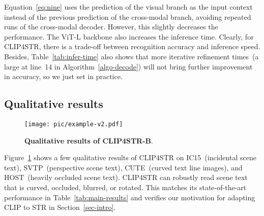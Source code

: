 \documentclass[lettersize,journal]{IEEEtran}
\begin{document}
Equation~\eqref{eq:nine} uses the prediction of the visual branch as the input context instead of the previous prediction of the cross-modal branch, avoiding repeated runs of the cross-modal decoder. However, this slightly decreases the performance.
The ViT-L backbone also increases the inference time.
Clearly, for CLIP4STR, there is a trade-off between recognition accuracy and inference speed. Besides, Table~\ref{tab:infer-time} also shows that more iterative refinement times~(a large  at line~14 in Algorithm~\ref{algo-decode}) will not bring further improvement in accuracy, so we just set  in practice.



\subsection{Qualitative results} \label{sec:qualitative}
\begin{figure}[t]
	\centering
	\texttt{[image: pic/example-v2.pdf]}
	\caption{\textbf{Qualitative results of CLIP4STR-B}.}
	\label{fig:qualitative}
\end{figure}
Figure~\ref{fig:qualitative} shows a few qualitative results of CLIP4STR on IC15~(incidental scene text), SVTP~(perspective scene text), CUTE~(curved text line images), and HOST~(heavily occluded scene text).
CLIP4STR can robustly read scene text that is curved, occluded, blurred, or rotated.
This matches its state-of-the-art performance in Table~\ref{tab:main-results} and verifies our motivation for adapting CLIP to STR in Section~\ref{sec-intro}.
\end{document}

